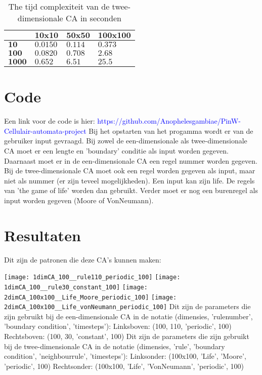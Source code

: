 \documentclass[12pt,a4paper]{article}
\begin{document}
\begin{table*}
    \centering
    \begin{tabular}{|m{1.2cm}|m{2.0cm}|m{2.0cm}|m{2.0cm}|}
        \hline
        $\phantom{.}$ & $\textbf{10x10}$ & $\textbf{50x50}$ & $\textbf{100x100}$ \\
        \hline
        $\textbf{10}$ & $0.0150$ & $0.114$ & $0.373$ \\
        \hline
        $\textbf{100}$ & $0.0820$ & $0.708$ & $2.68$ \\
        \hline
        $\textbf{1000}$ & $0.652$ & $6.51$ & $25.5$ \\
        \hline
    \end{tabular}
    \caption{The tijd complexiteit van de twee-dimensionale CA in seconden}
    \label{tbl:2dim}
\end{table*}

\section*{Code}
Een link voor de code is hier: 
\textcolor{blue}{https://github.com/Anophelesgambiae/PinW-Cellulair-automata-project}
\newline
Bij het opstarten van het progamma wordt er van de gebruiker input gevraagd.
\newline
Bij zowel de een-dimensionale als twee-dimensionale CA moet 
er een lengte en 'boundary' conditie als input worden gegeven.
Daarnaast moet er in de een-dimensionale CA een regel nummer worden gegeven.
Bij de twee-dimensionale CA moet ook een regel worden gegeven als input, maar niet als nummer (er zijn teveel mogelijkheden).
Een input kan zijn life. De regels van 'the game of life' worden dan gebruikt.
Verder moet er nog een burenregel als input worden gegeven (Moore of VonNeumann).

\section*{Resultaten}
Dit zijn de patronen die deze CA's kunnen maken:
\newline
\graphicspath{ {./CA_project_2024/} }
\texttt{[image: 1dimCA\_100\_\_rule110\_periodic\_100]}
\texttt{[image: 1dimCA\_100\_\_rule30\_constant\_100]}
\texttt{[image: 2dimCA\_100x100\_\_Life\_Moore\_periodic\_100]}
\texttt{[image: 2dimCA\_100x100\_\_Life\_vonNeumann\_periodic\_100]}
\newline
Dit zijn de parameters die zijn gebruikt 
bij de een-dimensionale CA in de notatie 
(dimensies, 'rulenumber', 'boundary condition', 'timesteps'):
\newline
Linksboven: (100, 110, 'periodic', 100)
\newline
Rechtsboven: (100, 30, 'constant', 100)
\newline
Dit zijn de parameters die zijn gebruikt 
bij de twee-dimensionale CA in de notatie 
(dimensies, 'rule', 'boundary condition', 'neighbourrule', 'timesteps'):
\newline
Linksonder: (100x100, 'Life', 'Moore', 'periodic', 100)
\newline
Rechtsonder: (100x100, 'Life', 'VonNeumann', 'periodic', 100)
\end{document}
